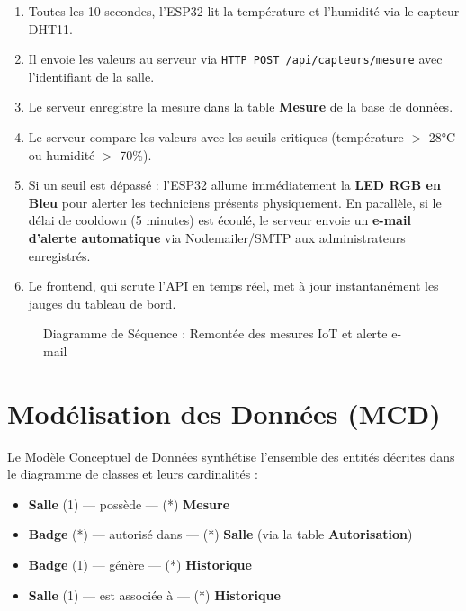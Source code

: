 \documentclass[12pt,a4paper]{report}
\begin{document}
\begin{enumerate}
    \item Toutes les 10 secondes, l'ESP32 lit la température et l'humidité via le capteur DHT11.
    \item Il envoie les valeurs au serveur via \texttt{HTTP POST /api/capteurs/mesure} avec l'identifiant de la salle.
    \item Le serveur enregistre la mesure dans la table \textbf{Mesure} de la base de données.
    \item Le serveur compare les valeurs avec les seuils critiques (température $>$ 28°C ou humidité $>$ 70\%).
    \item Si un seuil est dépassé : l'ESP32 allume immédiatement la \textbf{LED RGB en Bleu} pour alerter les techniciens présents physiquement. En parallèle, si le délai de cooldown (5 minutes) est écoulé, le serveur envoie un \textbf{e-mail d'alerte automatique} via Nodemailer/SMTP aux administrateurs enregistrés.
    \item Le frontend, qui scrute l'API en temps réel, met à jour instantanément les jauges du tableau de bord.
\end{enumerate}

\begin{figure}[h]
    \centering
    \caption{Diagramme de Séquence : Remontée des mesures IoT et alerte e-mail}
\end{figure}

\section{Modélisation des Données (MCD)}

Le Modèle Conceptuel de Données synthétise l'ensemble des entités décrites dans le diagramme de classes et leurs cardinalités :

\begin{itemize}
    \item \textbf{Salle} (1) --- possède --- (*) \textbf{Mesure}
    \item \textbf{Badge} (*) --- autorisé dans --- (*) \textbf{Salle} (via la table \textbf{Autorisation})
    \item \textbf{Badge} (1) --- génère --- (*) \textbf{Historique}
    \item \textbf{Salle} (1) --- est associée à --- (*) \textbf{Historique}
\end{itemize}
\end{document}
